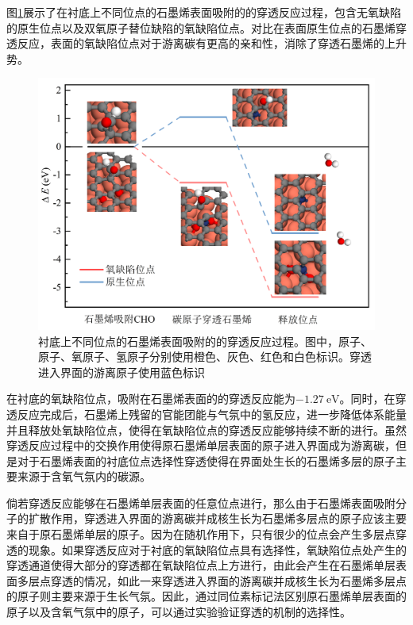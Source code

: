 图\ref{fig:FLG_DFT_CHOpene}展示了在衬底上不同位点的石墨烯表面吸附的的穿透反应过程，包含无氧缺陷的原生位点以及双氧原子替位缺陷的氧缺陷位点。对比在表面原生位点的石墨烯穿透反应，表面的氧缺陷位点对于游离碳有更高的亲和性，消除了穿透石墨烯的上升势。


\begin{figure}[htb]
    \includegraphics{pic/FLG_DFT_CHOpene.png}
    \caption{衬底上不同位点的石墨烯表面吸附的的穿透反应过程。图中，原子、原子、氧原子、氢原子分别使用橙色、灰色、红色和白色标识。穿透进入界面的游离原子使用蓝色标识}
    \label{fig:FLG_DFT_CHOpene}
\end{figure}

在衬底的氧缺陷位点，吸附在石墨烯表面的的穿透反应能为$\SI{-1.27}{\electronvolt}$。同时，在穿透反应完成后，石墨烯上残留的官能团能与气氛中的氢反应，进一步降低体系能量并且释放处氧缺陷位点，使得在氧缺陷位点的穿透反应能够持续不断的进行。虽然穿透反应过程中的交换作用使得原石墨烯单层表面的原子进入界面成为游离碳，但是对于石墨烯表面的衬底位点选择性穿透使得在界面处生长的石墨烯多层的原子主要来源于含氧气氛内的碳源。


倘若穿透反应能够在石墨烯单层表面的任意位点进行，那么由于石墨烯表面吸附分子的扩散作用，穿透进入界面的游离碳并成核生长为石墨烯多层点的原子应该主要来自于原石墨烯单层的原子。因为在随机作用下，只有很少的位点会产生多层点穿透的现象。如果穿透反应对于衬底的氧缺陷位点具有选择性，氧缺陷位点处产生的穿透通道使得大部分的穿透都在氧缺陷位点上方进行，由此会产生在石墨烯单层表面多层点穿透的情况，如此一来穿透进入界面的游离碳并成核生长为石墨烯多层点的原子则主要来源于生长气氛。因此，通过同位素标记法区别原石墨烯单层表面的原子以及含氧气氛中的原子，可以通过实验验证穿透的机制的选择性。

